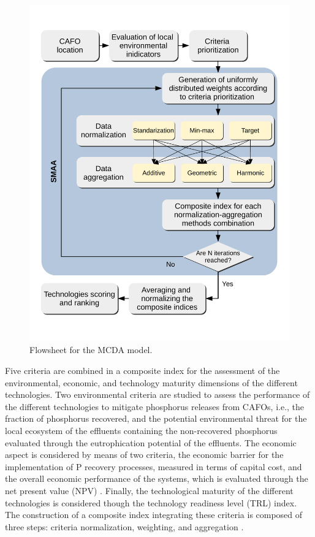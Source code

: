 \begin{refsection}[referencesCh4]
\begin{figure}[h]
	\centering
	\includegraphics[width=0.8\linewidth, trim={0cm 1cm 0cm 1cm},clip]{gfx/Chapter4/MCDA_SMAA.pdf} 
	\caption{Flowsheet for the MCDA model.}
	\label{fig:MCDA_SMAA}
\end{figure}

Five criteria are combined in a composite index for the assessment of the environmental, economic, and technology maturity dimensions of the different technologies. Two environmental criteria are studied to assess the performance of the different technologies to mitigate phosphorus releases from CAFOs, i.e., the fraction of phosphorus recovered, and the potential environmental threat for the local ecosystem of the effluents containing the non-recovered phosphorus evaluated through the eutrophication potential of the effluents. The economic aspect is considered by means of two criteria, the economic barrier for the implementation of P recovery processes, measured in terms of capital cost, and the overall economic performance of the systems, which is evaluated through the net present value (NPV) \citep{sinnott2014chemical}. Finally, the technological maturity of the different technologies is considered though the technology readiness level (TRL) index. The construction of a composite index integrating these criteria is composed of three steps: criteria normalization, weighting, and aggregation \citep{MarcoCinelli2020}.


\end{refsection}
